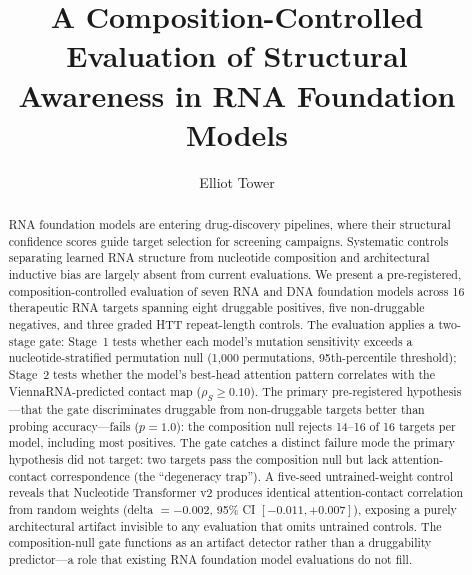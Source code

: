 \documentclass[11pt]{article}
\title{A Composition-Controlled Evaluation of Structural\\
Awareness in RNA Foundation Models}
\author{Elliot Tower}
\affil{Independent researcher \\ \texttt{elliot@elliottower.ai}}
\date{}
\begin{document}
\maketitle

\begin{abstract}
RNA foundation models are entering drug-discovery pipelines, where their
structural confidence scores guide target selection for screening campaigns.
Systematic controls separating learned RNA structure from nucleotide
composition and architectural inductive bias are largely absent from current
evaluations. We present a pre-registered, composition-controlled
evaluation of seven RNA and DNA foundation models across 16 therapeutic RNA
targets spanning eight druggable positives, five non-druggable negatives, and
three graded HTT repeat-length controls. The evaluation applies a two-stage
gate: Stage~1 tests whether each model's mutation sensitivity exceeds a
nucleotide-stratified permutation null (1,000 permutations, 95th-percentile
threshold); Stage~2 tests whether the model's best-head attention pattern
correlates with the ViennaRNA-predicted contact map ($\rho_S \geq 0.10$).
The primary pre-registered hypothesis---that the gate
discriminates druggable from non-druggable targets better than probing
accuracy---fails ($p = 1.0$): the composition null rejects 14--16 of 16
targets per model, including most positives. The gate catches a distinct
failure mode the primary hypothesis did not target: two targets pass the
composition null but lack attention-contact correspondence (the ``degeneracy
trap''). A five-seed untrained-weight control reveals that Nucleotide
Transformer v2 produces identical attention-contact correlation from random
weights (delta $= -0.002$, 95\% CI $[-0.011, +0.007]$), exposing a purely
architectural artifact invisible to any evaluation that omits untrained
controls. The composition-null gate functions as an artifact detector rather
than a druggability predictor---a role that existing RNA foundation model
evaluations do not fill.
\end{abstract}
\end{document}
